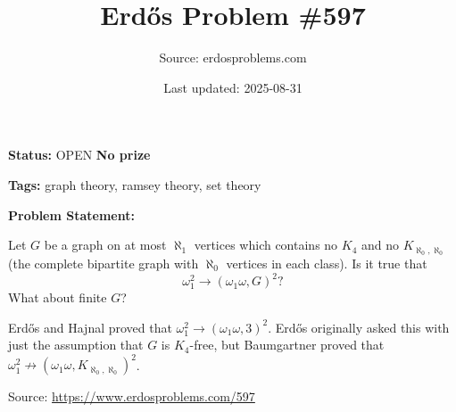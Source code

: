 \documentclass{article}
\title{Erd\H{o}s Problem \#597}
\date{Last updated: 2025-08-31}
\author{Source: erdosproblems.com}
\begin{document}
\maketitle

\noindent\textbf{Status:} OPEN \quad \textbf{No prize}

\noindent\textbf{Tags:} graph theory, ramsey theory, set theory

\medskip

\noindent\textbf{Problem Statement:}

Let $G$ be a graph on at most $\aleph_1$ vertices which contains no $K_4$ and no $K_{\aleph_0,\aleph_0}$ (the complete bipartite graph with $\aleph_0$ vertices in each class). Is it true that\[\omega_1^2 \to (\omega_1\omega, G)^2?\]What about finite $G$?




Erd\H{o}s and Hajnal proved that $\omega_1^2 \to (\omega_1\omega,3)^2$. Erd\H{o}s originally asked this with just the assumption that $G$ is $K_4$-free, but Baumgartner proved that $\omega_1^2 \not\to (\omega_1\omega, K_{\aleph_0,\aleph_0})^2$.


\bigskip
\noindent\small{Source: \url{https://www.erdosproblems.com/597}}
\end{document}
